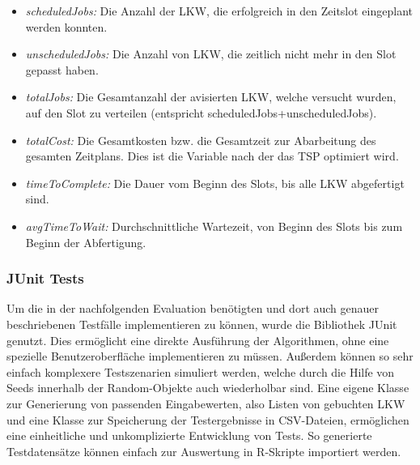 \begin{itemize}
    \item \textit{scheduledJobs:} Die Anzahl der LKW, die erfolgreich in den Zeitslot eingeplant werden konnten.
    \item \textit{unscheduledJobs:} Die Anzahl von LKW, die zeitlich nicht mehr in den Slot gepasst haben.
    \item \textit{totalJobs:} Die Gesamtanzahl der avisierten LKW, welche versucht wurden, auf den Slot zu verteilen (entspricht scheduledJobs+unscheduledJobs).
    \item \textit{totalCost:} Die Gesamtkosten bzw. die Gesamtzeit zur Abarbeitung des gesamten Zeitplans. Dies ist die Variable nach der das TSP optimiert wird.
    \item \textit{timeToComplete:} Die Dauer vom Beginn des Slots, bis alle LKW abgefertigt sind.
    \item \textit{avgTimeToWait:} Durchschnittliche Wartezeit, von Beginn des Slots bis zum Beginn der Abfertigung.
\end{itemize}


\subsubsection{JUnit Tests}

Um die in der nachfolgenden Evaluation benötigten und dort auch genauer beschriebenen Testfälle implementieren zu können, wurde die Bibliothek JUnit genutzt. Dies ermöglicht eine direkte Ausführung der Algorithmen, ohne eine spezielle Benutzeroberfläche implementieren zu müssen. Außerdem können so sehr einfach komplexere Testszenarien simuliert werden, welche durch die Hilfe von Seeds innerhalb der Random-Objekte auch wiederholbar sind. Eine eigene Klasse zur Generierung von passenden Eingabewerten, also Listen von gebuchten LKW und eine Klasse zur Speicherung der Testergebnisse in CSV-Dateien, ermöglichen eine einheitliche und unkomplizierte Entwicklung von Tests. So generierte Testdatensätze können einfach zur Auswertung in R-Skripte importiert werden.